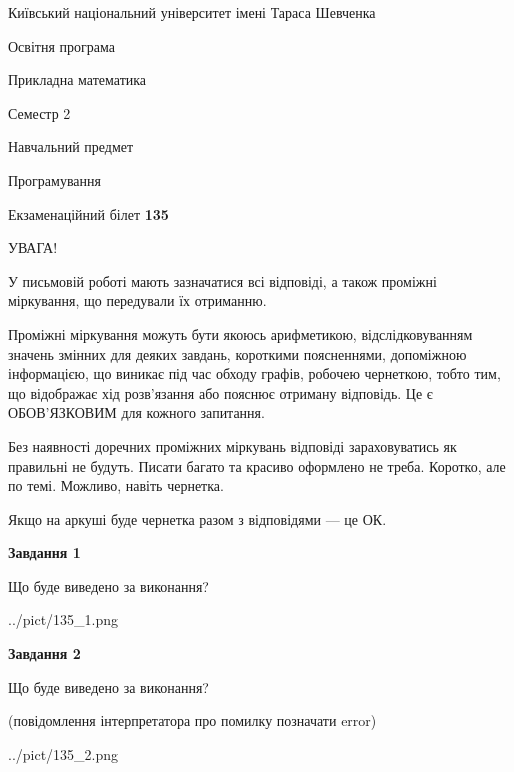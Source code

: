 \documentclass[12pt, ukrainian]{article}
\begin{document}
{{\begin {small}\par
{ \center  Київський національний університет імені Тараса Шевченка \par}
{\parbox {5 cm}{Освітня програма \hfill}{\parbox {7 cm}{Прикладна математика\hfill}}\parbox {6 cm}{\hfill Семестр 2}}\par
{\parbox {5 cm} {Навчальний предмет \hfill}\parbox {7 cm}{Програмування \hfill}\parbox {6cm}{\hfill}\par}\vspace{-7pt} \end{small}}{\center Екзаменаційний білет \No \textbf
{ 135 }\par}}
{
\begin {large}
УВАГА!

У письмовій роботі мають зазначатися всі відповіді, а також проміжні міркування, що передували їх отриманню.

Проміжні міркування можуть бути якоюсь арифметикою, відслідковуванням зна\-чень змінних для деяких завдань,
короткими поясненнями, допоміжною інформацією, що виникає під час обходу графів, робочею чернеткою,
тобто тим, що відображає хід розв’язання або пояснює отриману відповідь.
Це є ОБОВ’ЯЗКОВИМ для кожного запитання.

Без наявності доречних проміжних міркувань відповіді зараховуватись як правиль\-ні не будуть.
Писати багато та красиво оформлено не треба. Коротко, але по темі. Можли\-во, навіть чернетка.

Якщо на аркуші буде чернетка разом з відповідями --- це ОК.

\newpage

{\begin {center}\textbf{Завдання 1}\end {center}}\par
Що буде виведено за виконання?\par
\begin{center}
	{../pict/135_1.png}
\end{center}
\newpage

{\begin {center}\textbf{Завдання 2}\end {center}}\par
Що буде виведено за виконання?\par
 (повідомлення інтерпретатора про помилку позначати error)\par
\begin{center}
	{../pict/135_2.png}
\end{center}
\newpage


\end{large}}
\end{document}
